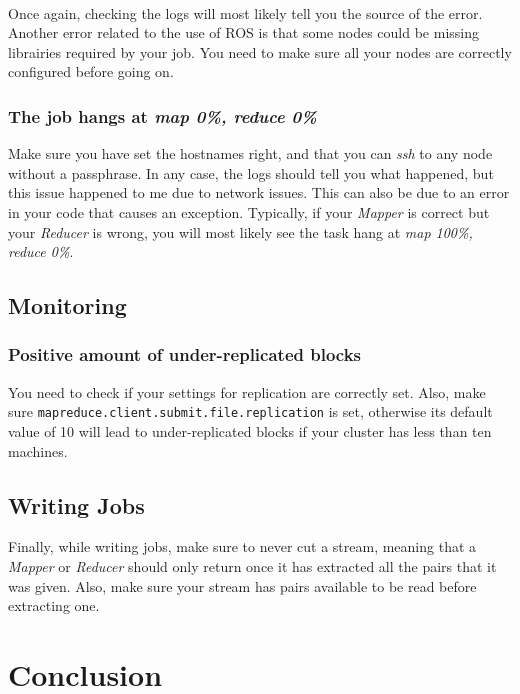 \documentclass[a4paper, 12pt]{article}
\begin{document}
~\\
Once again, checking the logs will most likely tell you the source of the error. Another error related to the use of ROS is that some nodes could be missing librairies required by your job. You need to make sure all your nodes are correctly configured before going on.
   
    \subsubsection*{The job hangs at \textit{map 0\%, reduce 0\%}}

Make sure you have set the hostnames right, and that you can \textit{ssh} to any node without a passphrase. In any case, the logs should tell you what happened, but this issue happened to me due to network issues. This can also be due to an error in your code that causes an exception. Typically, if your \textit{Mapper} is correct but your \textit{Reducer} is wrong, you will most likely see the task hang at \textit{map 100\%, reduce 0\%}.
    
  \subsection{Monitoring}
  
    \subsubsection*{Positive amount of under-replicated blocks}
    
You need to check if your settings for replication are correctly set. Also, make sure \texttt{mapreduce.client.submit.file.replication} is set, otherwise its default value of 10 will lead to under-replicated blocks if your cluster has less than ten machines.

  \subsection{Writing Jobs}

Finally, while writing jobs, make sure to never cut a stream, meaning that a \textit{Mapper} or \textit{Reducer} should only return once it has extracted all the pairs that it was given. Also, make sure your stream has pairs available to be read before extracting one.

\section{Conclusion}
\end{document}

